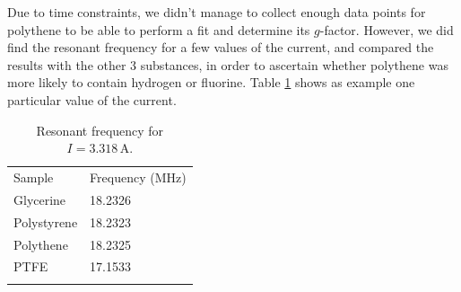 \documentclass[a4paper]{jpconf}
\numberwithin{equation}{section}
\begin{document}
Due to time constraints, we didn't manage to collect enough data points for polythene to be able to perform a fit and determine its $g$-factor. However, we did find the resonant frequency for a few values of the current, and compared the results with the other 3 substances, in order to ascertain whether polythene was more likely to contain hydrogen or fluorine. Table \ref{table: polythene} shows as example one particular value of the current.

\begin{table}[htbp]
	\caption{\label{table: polythene} Resonant frequency for $I = 3.318 \, \si{\ampere}$.}
	\begin{center}
		\begin{tabular}{ll}
			\br
			Sample&Frequency ($\si{\mega\hertz}$)\\
			\mr
			Glycerine&18.2326\\
			Polystyrene&18.2323\\
			Polythene&18.2325\\
			PTFE&17.1533\\
			\br
		\end{tabular}
	\end{center}
\end{table}

\end{document}
